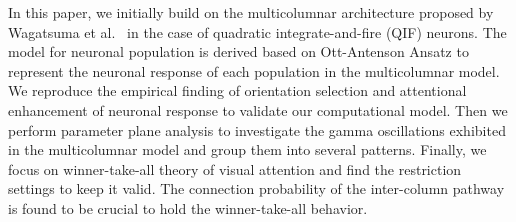 \documentclass[10pt,letterpaper]{article}
\begin{document}
In this paper, we initially build on the multicolumnar architecture proposed by Wagatsuma et al.~\cite{wagatsuma2011} in the case of quadratic integrate-and-fire (QIF) neurons. The model for neuronal population is derived based on Ott-Antenson Ansatz to represent the neuronal response of each population in the multicolumnar model. We reproduce the empirical finding of orientation selection and attentional enhancement of neuronal response to validate our computational model. Then we perform parameter plane analysis to investigate the gamma oscillations exhibited in the multicolumnar model and group them into several patterns. Finally, we focus on winner-take-all theory of visual attention and find the restriction settings to keep it valid. The connection probability of the inter-column pathway is found to be crucial to hold the winner-take-all behavior.
\end{document}
